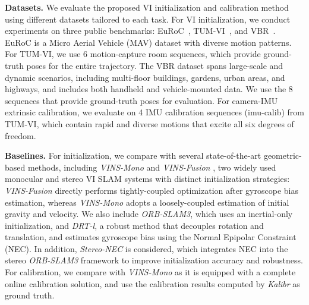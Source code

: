 \noindent\textbf{Datasets.} 
We evaluate the proposed VI initialization and calibration method using different datasets tailored to each task. For VI initialization, we conduct experiments on three public benchmarks: EuRoC~\cite{burri2016euroc}, TUM-VI~\cite{schubert2018tum}, and VBR~\cite{brizi2024vbr}. EuRoC is a Micro Aerial Vehicle (MAV) dataset with diverse motion patterns. For TUM-VI, we use 6 motion-capture room sequences, which provide ground-truth poses for the entire trajectory. The VBR dataset spans large-scale and dynamic scenarios, including multi-floor buildings, gardens, urban areas, and highways, and includes both handheld and vehicle-mounted data. We use the 8 sequences that provide ground-truth poses for evaluation.
For camera-IMU extrinsic calibration, we evaluate on 4 IMU calibration sequences (imu-calib) from TUM-VI, which contain rapid and diverse motions that excite all six degrees of freedom.


\noindent\textbf{Baselines.}
For initialization, we compare with several state-of-the-art geometric-based methods, including \textit{VINS-Mono} and \textit{VINS-Fusion} \cite{qin2018vins}, two widely used monocular and stereo VI SLAM systems with distinct initialization strategies: \textit{VINS-Fusion} directly performs tightly-coupled optimization after gyroscope bias estimation, whereas \textit{VINS-Mono} adopts a loosely-coupled estimation of initial gravity and velocity. We also include \textit{ORB-SLAM3}\cite{campos2021orb}, which uses an inertial-only initialization, and \textit{DRT-l}\cite{he2023rotation}, a robust method that decouples rotation and translation, and estimates gyroscope bias using the Normal Epipolar Constraint (NEC). In addition, \textit{Stereo-NEC}\cite{wang2024stereo} is considered, which integrates NEC into the stereo \textit{ORB-SLAM3} framework to improve initialization accuracy and robustness.  
For calibration, we compare with \textit{VINS-Mono} as it is equipped with a complete online calibration solution, and use the calibration results computed by \textit{Kalibr}\cite{kalibr} as ground truth.


